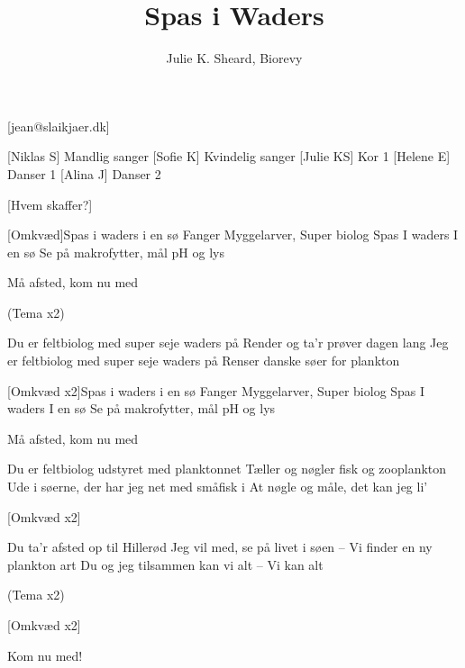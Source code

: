 \documentclass[a4paper,12pt]{article}
\title{Spas i Waders}
\author{Julie K. Sheard, Biorevy}
\begin{document}
\maketitle

\begin{texxers}
	[jean@slaikjaer.dk]
\end{texxers}

\begin{roles}
	[Niklas S] Mandlig sanger
	[Sofie K] Kvindelig sanger
	[Julie KS] Kor 1
	[Helene E] Danser 1
	[Alina J] Danser 2
\end{roles}


\begin{props}
	[Hvem skaffer?] 
\end{props}

\begin{song}


[Omkvæd]Spas i waders i en sø
Fanger Myggelarver, Super biolog 
Spas I waders I en sø
Se på makrofytter, mål pH og lys

Må afsted, kom nu med

(Tema x2)

Du er feltbiolog med super seje waders på
Render og ta'r prøver dagen lang
Jeg er feltbiolog med super seje waders på
Renser danske søer for plankton

[Omkvæd x2]Spas i waders i en sø
Fanger Myggelarver, Super biolog 
Spas I waders I en sø
Se på makrofytter, mål pH og lys

Må afsted, kom nu med
 
Du er feltbiolog udstyret med planktonnet
Tæller og nøgler fisk og zooplankton
Ude i søerne, der har jeg net med småfisk i  
At nøgle og måle, det kan jeg li'

[Omkvæd x2]

Du ta'r afsted op til Hillerød
Jeg vil med, se på livet i søen 
 -- Vi finder en ny plankton art
Du og jeg tilsammen kan vi alt 
 -- Vi kan alt
 
 (Tema x2)

[Omkvæd x2]

Kom nu med!



\end{song}
\end{document}
